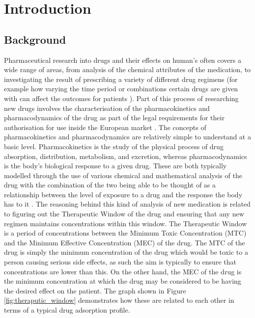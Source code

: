 \section{Introduction}

\subsection{Background} \label{background}
Pharmaceutical research into drugs and their effects on human's often covers a wide range of areas, from analysis of the chemical attributes of the medication, to investigating the result of prescribing a variety of different drug regimens (for example how varying the time period or combinations certain drugs are given with can affect the outcomes for patients \cite{doi:10.1056/NEJMoa011954}). Part of this process of researching new drugs involves the characterisation of the pharmacokinetics and pharmacodynamics of the drug as part of the legal requirements for their authorisation for use inside the European market \cite{2001_83_EC_Directive_For_Pharmacokinetic_Characterisation}. The concepts of pharmacokinetics and pharmacodynamics are relatively simple to understand at a basic level. Pharmacokinetics is the study of the physical process of drug absorption, distribution, metabolism, and excretion, whereas pharmacodynamics is the body's biological response to a given drug. These are both typically modelled through the use of various chemical and mathematical analysis of the drug with the combination of the two being able to be thought of as a relationship between the level of exposure to a drug and the response the body has to it \cite{holford1982kinetics}. The reasoning behind this kind of analysis of new medication is related to figuring out the Therapeutic Window of the drug and ensuring that any new regimen maintains concentrations within this window. The Therapeutic Window is a period of concentrations between the Minimum Toxic Concentration (MTC) and the Minimum Effective Concentration (MEC) of the drug. The MTC of the drug is simply the minimum concentration of the drug which would be toxic to a person causing serious side effects, as such the aim is typically to ensure that concentrations are lower than this. On the other hand, the MEC of the drug is the minimum concentration at which the drug may be considered to be having the desired effect on the patient. The graph shown in Figure \ref{fig:theraputic_window} demonstrates how these are related to each other in terms of a typical drug adsorption profile. 
	
